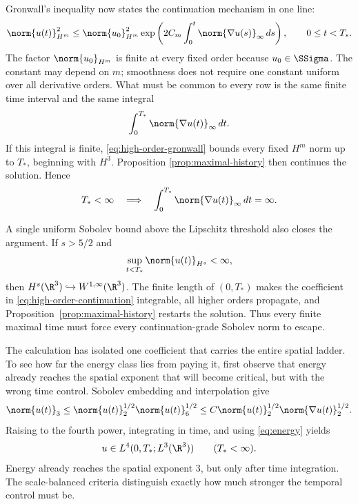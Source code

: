 Gronwall's inequality now states the continuation mechanism in one line:
\begin{equation}
 \norm{u(t)}_{H^m}^2
 \le \norm{u_0}_{H^m}^2
 \exp\left(
  2C_m\int_0^t\norm{\nabla u(s)}_\infty\,ds
 \right),
 \qquad 0\le t<T_*.
 \label{eq:high-order-gronwall}
\end{equation}
The factor \(\norm{u_0}_{H^m}\) is finite at every fixed order because
\(u_0\in\SSigma\).  The constant may depend on \(m\); smoothness does not
require one constant uniform over all derivative orders.  What must be common
to every row is the same finite time interval and the same integral
\[
 \int_0^{T_*}\norm{\nabla u(t)}_\infty\,dt.
\]
If this integral is finite, \eqref{eq:high-order-gronwall} bounds every fixed
\(H^m\) norm up to \(T_*\), beginning with \(H^3\).  Proposition
\ref{prop:maximal-history} then continues the solution.  Hence
\begin{equation}
 T_*<\infty
 \quad\Longrightarrow\quad
 \int_0^{T_*}\norm{\nabla u(t)}_\infty\,dt=\infty.
 \label{eq:lipschitz-blowup-criterion}
\end{equation}

A single uniform Sobolev bound above the Lipschitz threshold also closes the
argument.  If \(s>5/2\) and
\[
 \sup_{t<T_*}\norm{u(t)}_{H^s}<\infty,
\]
then \(H^s(\R^3)\hookrightarrow W^{1,\infty}(\R^3)\).  The finite length of
\((0,T_*)\) makes the coefficient in
\eqref{eq:high-order-continuation} integrable, all higher orders propagate,
and Proposition~\ref{prop:maximal-history} restarts the solution.  Thus every
finite maximal time
must force every continuation-grade Sobolev norm to escape.

The calculation has isolated one coefficient that carries the entire spatial
ladder.  To see how far the energy class lies from paying it, first observe
that energy already reaches the spatial exponent that will become critical,
but with the wrong time control.  Sobolev embedding and interpolation
give
\begin{equation*}
 \norm{u(t)}_3
 \le \norm{u(t)}_2^{1/2}\norm{u(t)}_6^{1/2}
 \le C\norm{u(t)}_2^{1/2}\norm{\nabla u(t)}_2^{1/2}.
\end{equation*}
Raising to the fourth power, integrating in time, and using
\eqref{eq:energy} yields
\begin{equation*}
 u\in L^4(0,T_*;L^3(\R^3))
 \qquad (T_*<\infty).
\end{equation*}
Energy already reaches the spatial exponent \(3\), but only after time
integration.  The scale-balanced criteria distinguish exactly how much
stronger the temporal control must be.

